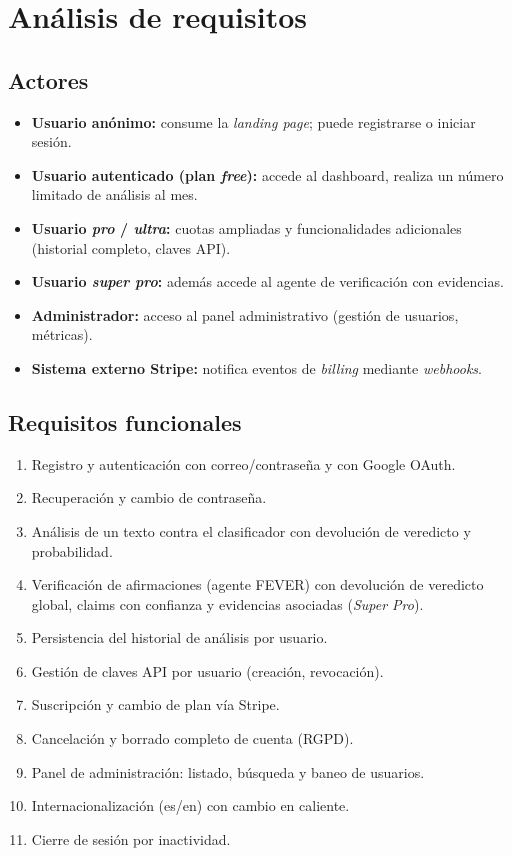 \chapter{Análisis de requisitos}\label{cap:requisitos}

\section{Actores}

\begin{itemize}[leftmargin=*,itemsep=0.2em]
  \item \textbf{Usuario anónimo:} consume la \emph{landing page};
        puede registrarse o iniciar sesión.
  \item \textbf{Usuario autenticado (plan \emph{free}):} accede al
        dashboard, realiza un número limitado de análisis al mes.
  \item \textbf{Usuario \emph{pro} / \emph{ultra}:} cuotas ampliadas y
        funcionalidades adicionales (historial completo, claves API).
  \item \textbf{Usuario \emph{super pro}:} además accede al agente de
        verificación con evidencias.
  \item \textbf{Administrador:} acceso al panel administrativo
        (gestión de usuarios, métricas).
  \item \textbf{Sistema externo Stripe:} notifica eventos de
        \emph{billing} mediante \emph{webhooks}.
\end{itemize}

\section{Requisitos funcionales}

\begin{enumerate}[label=RF-\arabic*,leftmargin=*,itemsep=0.2em]
  \item Registro y autenticación con correo/contraseña y con Google
        OAuth.
  \item Recuperación y cambio de contraseña.
  \item Análisis de un texto contra el clasificador con devolución de
        veredicto y probabilidad.
  \item Verificación de afirmaciones (agente FEVER) con devolución de
        veredicto global, claims con confianza y evidencias asociadas
        (\emph{Super Pro}).
  \item Persistencia del historial de análisis por usuario.
  \item Gestión de claves API por usuario (creación, revocación).
  \item Suscripción y cambio de plan vía Stripe.
  \item Cancelación y borrado completo de cuenta (RGPD).
  \item Panel de administración: listado, búsqueda y baneo de usuarios.
  \item Internacionalización (es/en) con cambio en caliente.
  \item Cierre de sesión por inactividad.
\end{enumerate}

